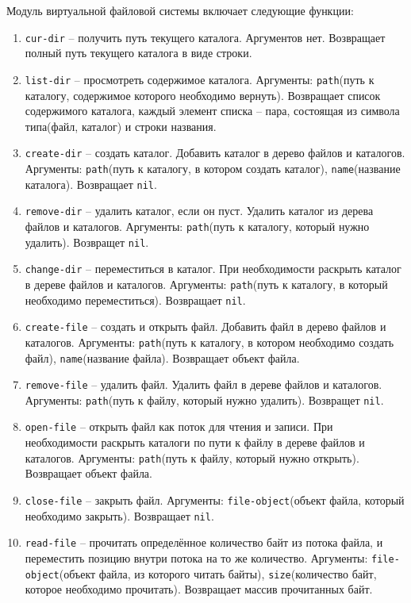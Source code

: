 Модуль виртуальной файловой системы включает следующие функции:

\begin{enumerate}
	\item \texttt{cur-dir} -- получить путь текущего каталога. Аргументов нет. Возвращает полный путь текущего каталога в виде строки.
	\item \texttt{list-dir} -- просмотреть содержимое каталога. Аргументы: \texttt{path}(путь к каталогу, содержимое которого необходимо вернуть). Возвращает список содержимого каталога, каждый элемент списка -- пара, состоящая из символа типа(файл, каталог) и строки названия.
	\item \texttt{create-dir} -- создать каталог. Добавить каталог в дерево файлов и каталогов. Аргументы: \texttt{path}(путь к каталогу, в котором создать каталог), \texttt{name}(название каталога). Возвращает \texttt{nil}.
	\item \texttt{remove-dir} -- удалить каталог, если он пуст. Удалить каталог из дерева файлов и каталогов. Аргументы: \texttt{path}(путь к каталогу, который нужно удалить). Возвращет \texttt{nil}.
	\item \texttt{change-dir} -- переместиться в каталог. При необходимости раскрыть каталог в дереве файлов и каталогов. Аргументы: \texttt{path}(путь к каталогу, в который необходимо переместиться). Возвращает \texttt{nil}.
	\item \texttt{create-file} -- создать и открыть файл. Добавить файл в дерево файлов и каталогов. Аргументы: \texttt{path}(путь к каталогу, в котором необходимо создать файл), \texttt{name}(название файла). Возвращает объект файла.
	\item \texttt{remove-file} -- удалить файл. Удалить файл в дереве файлов и каталогов. Аргументы: \texttt{path}(путь к файлу, который нужно удалить). Возвращет \texttt{nil}.
	\item \texttt{open-file} -- открыть файл как поток для чтения и записи. При необходимости раскрыть каталоги по пути к файлу в дереве файлов и каталогов. Аргументы: \texttt{path}(путь к файлу, который нужно открыть). Возвращает объект файла.
	\item \texttt{close-file} -- закрыть файл. Аргументы: \texttt{file-object}(объект файла, который необходимо закрыть). Возвращает \texttt{nil}.
	\item \texttt{read-file} -- прочитать определённое количество байт из потока файла, и переместить позицию внутри потока на то же количество. Аргументы: \texttt{file-object}(объект файла, из которого читать байты), \texttt{size}(количество байт, которое необходимо прочитать). Возвращает массив прочитанных байт.

\end{enumerate}
